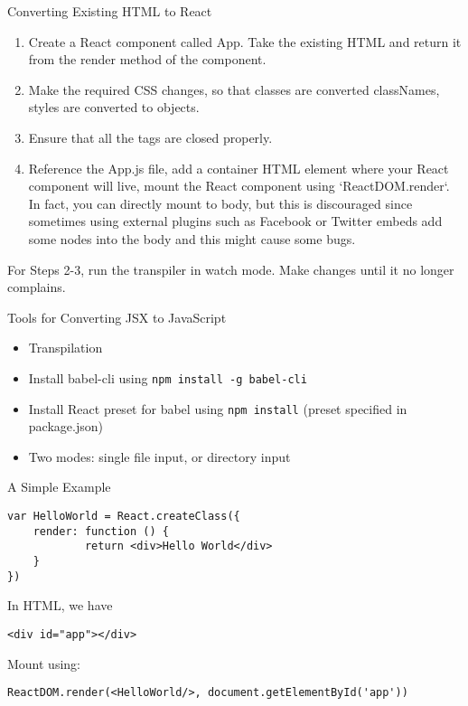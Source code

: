 \documentclass[presentation]{beamer}
\begin{document}
\begin{frame}[label={sec:orgheadline14}]{Converting Existing HTML to React}
\begin{enumerate}
\item Create a React component called App. Take the existing HTML  and return it from the render method of the component.

\item Make the required CSS changes, so that classes are converted classNames, styles are converted to objects.

\item Ensure that all the tags are closed properly.

\item Reference the App.js file, add a container HTML element where your React component will live, mount the React component using `ReactDOM.render`. In fact, you can directly mount to body, but this is discouraged since sometimes using external plugins such as Facebook or Twitter embeds add some nodes into the body and this might cause some bugs.
\end{enumerate}

For Steps 2-3, run the transpiler in watch mode. Make changes until it no
longer complains.
\end{frame}

\begin{frame}[fragile,label={sec:orgheadline15}]{Tools for Converting JSX to JavaScript}
 \begin{itemize}
\item Transpilation
\item Install \alert{babel-cli} using \texttt{npm install -g babel-cli}
\item Install React preset for babel using \texttt{npm install} (preset specified in package.json)
\item Two modes: single file input, or directory input
\end{itemize}
\end{frame}

\begin{frame}[fragile,label={sec:orgheadline16}]{A Simple Example}
 \begin{verbatim}
var HelloWorld = React.createClass({
    render: function () {
            return <div>Hello World</div>
    }
})
\end{verbatim}

In HTML, we have
\begin{verbatim}
<div id="app"></div>
\end{verbatim}
Mount using:
\begin{verbatim}
ReactDOM.render(<HelloWorld/>, document.getElementById('app'))
\end{verbatim}
\end{frame}
\end{document}

